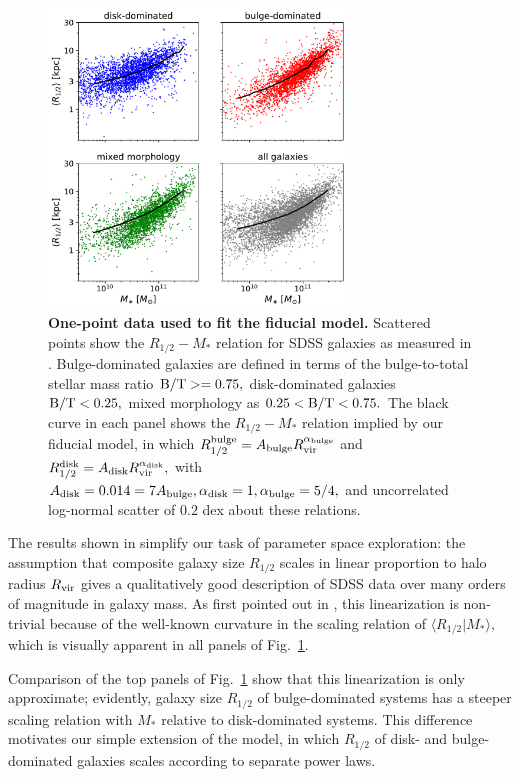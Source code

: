 \documentclass[usenatbib,usegraphicx,letterpaper]{mn2e}
\newcommand{\rhalf}{R_{1/2}}
\newcommand{\rhalfdisk}{R_{1/2}^{\rm disk}}
\newcommand{\rhalfbulge}{R_{1/2}^{\rm bulge}}
\newcommand{\adisk}{A_{\rm disk}}
\newcommand{\abulge}{A_{\rm bulge}}
\newcommand{\alphadisk}{\alpha_{\rm disk}}
\newcommand{\alphabulge}{\alpha_{\rm bulge}}
\newcommand{\rvir}{R_{\rm vir}}
\newcommand{\bt}{{\rm B/T}}
\newcommand{\mstar}{M_{\ast}}
\begin{document}
\begin{figure}
\centering
\includegraphics[width=8cm]{FIGS/size_vs_stellar_mass_multipanel_bt_decomposition.pdf}
\caption{
{\bf One-point data used to fit the fiducial model.}
Scattered points show the $\rhalf-\mstar$ relation for SDSS galaxies as measured in \citet{meert_etal15}. Bulge-dominated galaxies are defined in terms of the bulge-to-total stellar mass ratio $\bt>=0.75,$ disk-dominated galaxies $\bt<0.25,$ mixed morphology as $0.25 < \bt < 0.75.$ The black curve in each panel shows the $\rhalf-\mstar$ relation implied by our fiducial model, in which $\rhalfbulge=\abulge\rvir^{\alphabulge}$ and $\rhalfdisk=\adisk\rvir^{\alphadisk},$ with $\adisk=0.014=7\abulge, \alphadisk=1, \alphabulge=5/4,$ and uncorrelated log-normal scatter of $0.2$ dex about these relations.
}
\label{fig:scatter_plot}
\end{figure}

The results shown in \citet{kravtsov13} simplify our task of parameter space exploration: the assumption that composite galaxy size $\rhalf$ scales in linear proportion to halo radius $\rvir$ gives a qualitatively good description of SDSS data over many orders of magnitude in galaxy mass. As first pointed out in \citet{kravtsov13}, this linearization is non-trivial because of the well-known curvature in the scaling relation of $\langle\rhalf\vert\mstar\rangle,$ which is visually apparent in all panels of Fig.~\ref{fig:scatter_plot}.

Comparison of the top panels of Fig.~\ref{fig:scatter_plot} show that this linearization is only approximate; evidently, galaxy size $\rhalf$ of bulge-dominated systems has a steeper scaling relation with $\mstar$ relative to disk-dominated systems. This difference motivates our simple extension of the \citet{kravtsov13} model, in which $\rhalf$ of disk- and bulge-dominated galaxies scales according to separate power laws.
\end{document}
